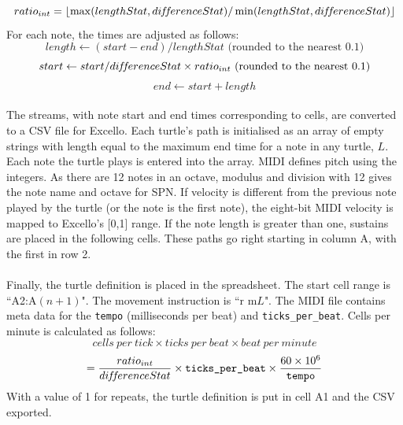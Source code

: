   $$ratio_{int} = \lfloor\max(lengthStat, di\hspace{-0.1em}f\hspace{-0.2em}f\hspace{-0.1em}erenceStat)/\min(lengthStat, di\hspace{-0.1em}f\hspace{-0.2em}f\hspace{-0.1em}erenceStat)\rfloor$$
For each note, the times are adjusted as follows:
  $$length \gets (start - end) / lengthStat \text{ (rounded to the nearest 0.1)}$$
  $$start \gets start / di\hspace{-0.1em}f\hspace{-0.2em}f\hspace{-0.1em}erenceStat \times ratio_{int} \text{ (rounded to the nearest 0.1)}$$
  $$end \gets start +length$$

\paragraph{} The streams, with note start and end times corresponding to cells, are converted to a CSV file for Excello. Each turtle's path is initialised as an array of empty strings with length equal to the maximum end time for a note in any turtle, $L$. Each note the turtle plays is entered into the array. MIDI defines pitch using the integers. As there are 12 notes in an octave, modulus and division with 12 gives the note name and octave for SPN. If velocity is different from the previous note played by the turtle (or the note is the first note), the eight-bit MIDI velocity is mapped to Excello's [0,1] range. If the note length is greater than one, sustains are placed in the following cells. These paths go right starting in column A, with the first in row 2.

\paragraph{} Finally, the turtle definition is placed in the spreadsheet. The start cell range is ``A2:A$(n+1)$". The movement instruction is ``r m$L$". The MIDI file contains meta data for the \texttt{tempo} (milliseconds per beat) and \texttt{ticks\_per\_beat}. Cells per minute is calculated as follows:
$$cells\ per\ tick \times ticks\ per\ beat \times beat\ per\ minute$$
$$= \frac{ratio_{int}}{di\hspace{-0.1em}f\hspace{-0.2em}f\hspace{-0.1em}erenceStat} \times \texttt{ticks\_per\_beat} \times \frac{60 \times 10^6}{\texttt{tempo}}$$
With a value of 1 for repeats, the turtle definition is put in cell A1 and the CSV exported.


